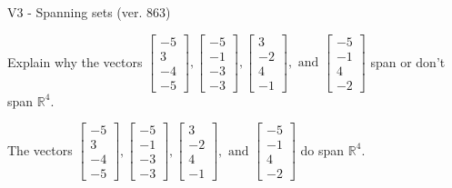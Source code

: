 \begin{exercise}
  \begin{exerciseTitle}V3 - Spanning sets (ver. 863)\end{exerciseTitle}
  \begin{exerciseStatement}
    Explain why the vectors \(\left[\begin{array}{r}
-5 \\
3 \\
-4 \\
-5
\end{array}\right] , \left[\begin{array}{r}
-5 \\
-1 \\
-3 \\
-3
\end{array}\right] , \left[\begin{array}{r}
3 \\
-2 \\
4 \\
-1
\end{array}\right] , \text{ and } \left[\begin{array}{r}
-5 \\
-1 \\
4 \\
-2
\end{array}\right]\) span or don't span \(\mathbb{R}^4\). 
	


  \end{exerciseStatement}
  \begin{exerciseAnswer}
   The vectors \(\left[\begin{array}{r}
-5 \\
3 \\
-4 \\
-5
\end{array}\right] , \left[\begin{array}{r}
-5 \\
-1 \\
-3 \\
-3
\end{array}\right] , \left[\begin{array}{r}
3 \\
-2 \\
4 \\
-1
\end{array}\right] , \text{ and } \left[\begin{array}{r}
-5 \\
-1 \\
4 \\
-2
\end{array}\right]\) 
  	 do  
	span \(\mathbb{R}^4\).
  


  \end{exerciseAnswer}
\end{exercise}